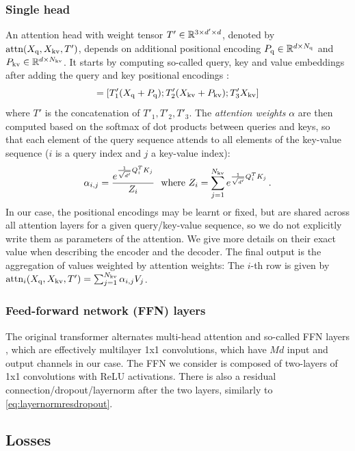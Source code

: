 \subsubsection{Single head} An attention head with weight tensor $T'\in\mathbb{R}^{3\times d'\times d}$, denoted by $\text{\rm attn}(X_{\rm q}, X_{\rm kv}, T')$, depends on additional positional encoding $P_{\rm q} \in\mathbb{R}^{d\times N_{\rm q}}$ and $P_{\rm kv}\in\mathbb{R}^{d\times N_{\rm kv}}$. 
It starts by computing so-called query, key and value embeddings after adding the query and key positional encodings \cite{Cordonnier2019OnTR}:
\begin{equation}
    [\ques; \keys; \vals] = [\weit'_1 (\xq+\posq);\weit'_2 (\xkv+\poskv); \weit'_3 \xkv]
\end{equation}
where $T'$ is the concatenation of $T'_1,T'_2,T'_3$. The \emph{attention weights} $\alpha$ are then computed based on the softmax of dot products between queries and keys, so that each element of the query sequence attends to all elements of the key-value sequence ($i$ is a query index and $j$ a key-value index):
\begin{equation}
    \alpha_{i,j} = \frac{e^{\frac{1}{\sqrt{d'}}Q_i^TK_j}}{Z_i} \text{~~where~} Z_i = \sum_{j=1}^{N_{\rm kv}}  e^{\frac{1}{\sqrt{d'}}Q_i^TK_{j}}\,.\label{eq:posenc}
\end{equation}
In our case, the positional encodings may be learnt or fixed, but are shared across all attention layers for a given query/key-value sequence, so we do not explicitly write them as parameters of the attention. We give more details on their exact value when describing the encoder and the decoder. The final output is the aggregation of values weighted by attention weights:  The $i$-th row is given by 
$%
    \attn_i(\xq, \xkv, \weit') = \sum_{j=1}^{\Nkv} \alpha_{i,j} \vals_j
$.

\subsubsection{Feed-forward network (FFN) layers} The original transformer alternates multi-head attention and so-called FFN layers \cite{Vaswani2017AttentionIA}, which are effectively multilayer 1x1 convolutions, which have $Md$ input and output channels in our case. The FFN we consider is composed of two-layers of 1x1 convolutions with ReLU activations. There is also a residual connection/dropout/layernorm after the two layers, similarly to \eqref{eq:layernormresdropout}.

\subsection{Losses}


